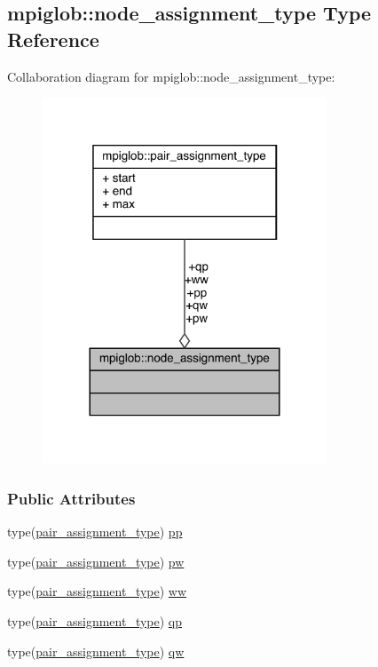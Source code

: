 \hypertarget{structmpiglob_1_1node__assignment__type}{\subsection{mpiglob\-:\-:node\-\_\-assignment\-\_\-type Type Reference}
\label{structmpiglob_1_1node__assignment__type}
}


Collaboration diagram for mpiglob\-:\-:node\-\_\-assignment\-\_\-type\-:
\nopagebreak
\begin{figure}[H]
\begin{center}
\leavevmode
\includegraphics[width=240pt]{structmpiglob_1_1node__assignment__type__coll__graph}
\end{center}
\end{figure}
\subsubsection*{Public Attributes}
\begin{DoxyCompactItemize}
\item 
type(\hyperlink{structmpiglob_1_1pair__assignment__type}{pair\-\_\-assignment\-\_\-type}) \hyperlink{structmpiglob_1_1node__assignment__type_a6892e03b2c3c46f6fcd517331f799e4c}{pp}
\item 
type(\hyperlink{structmpiglob_1_1pair__assignment__type}{pair\-\_\-assignment\-\_\-type}) \hyperlink{structmpiglob_1_1node__assignment__type_a781729388587601056d9b96338f618be}{pw}
\item 
type(\hyperlink{structmpiglob_1_1pair__assignment__type}{pair\-\_\-assignment\-\_\-type}) \hyperlink{structmpiglob_1_1node__assignment__type_a2f23d0b3aaead9ad8650dbd809e52aaf}{ww}
\item 
type(\hyperlink{structmpiglob_1_1pair__assignment__type}{pair\-\_\-assignment\-\_\-type}) \hyperlink{structmpiglob_1_1node__assignment__type_a705b532835302bf4055b0405f6dc8461}{qp}
\item 
type(\hyperlink{structmpiglob_1_1pair__assignment__type}{pair\-\_\-assignment\-\_\-type}) \hyperlink{structmpiglob_1_1node__assignment__type_a469fd7da5a4020d0fd00f6cabd89cde6}{qw}
\end{DoxyCompactItemize}


